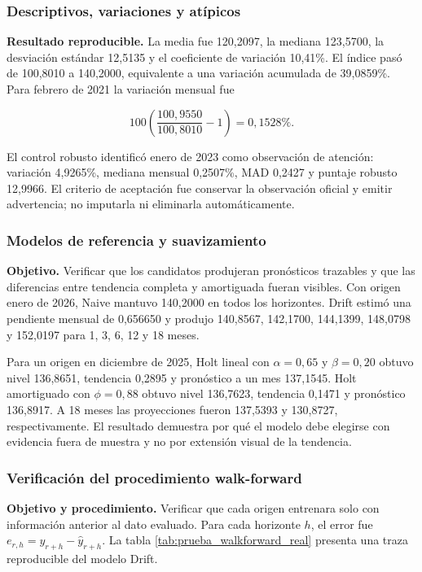 \documentclass[12pt,letterpaper]{article}
\begin{document}
\subsubsection{Descriptivos, variaciones y atípicos}

\textbf{Resultado reproducible.} La media fue 120,2097, la mediana 123,5700, la desviación estándar 12,5135 y el coeficiente de variación 10,41\%. El índice pasó de 100,8010 a 140,2000, equivalente a una variación acumulada de 39,0859\%. Para febrero de 2021 la variación mensual fue

\begin{equation}
100\left(\frac{100,9550}{100,8010}-1\right)=0,1528\%.
\end{equation}

El control robusto identificó enero de 2023 como observación de atención: variación 4,9265\%, mediana mensual 0,2507\%, MAD 0,2427 y puntaje robusto 12,9966. El criterio de aceptación fue conservar la observación oficial y emitir advertencia; no imputarla ni eliminarla automáticamente.

\subsubsection{Modelos de referencia y suavizamiento}

\textbf{Objetivo.} Verificar que los candidatos produjeran pronósticos trazables y que las diferencias entre tendencia completa y amortiguada fueran visibles. Con origen enero de 2026, Naive mantuvo 140,2000 en todos los horizontes. Drift estimó una pendiente mensual de 0,656650 y produjo 140,8567, 142,1700, 144,1399, 148,0798 y 152,0197 para 1, 3, 6, 12 y 18 meses.

Para un origen en diciembre de 2025, Holt lineal con \(\alpha=0,65\) y \(\beta=0,20\) obtuvo nivel 136,8651, tendencia 0,2895 y pronóstico a un mes 137,1545. Holt amortiguado con \(\phi=0,88\) obtuvo nivel 136,7623, tendencia 0,1471 y pronóstico 136,8917. A 18 meses las proyecciones fueron 137,5393 y 130,8727, respectivamente. El resultado demuestra por qué el modelo debe elegirse con evidencia fuera de muestra y no por extensión visual de la tendencia.

\subsubsection{Verificación del procedimiento walk-forward}

\textbf{Objetivo y procedimiento.} Verificar que cada origen entrenara solo con información anterior al dato evaluado. Para cada horizonte \(h\), el error fue \(e_{r,h}=y_{r+h}-\hat{y}_{r+h}\). La tabla \ref{tab:prueba_walkforward_real} presenta una traza reproducible del modelo Drift.
\end{document}
